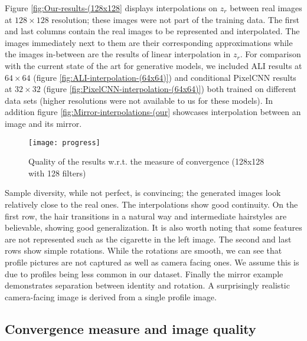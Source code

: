 \documentclass[english]{article}
\begin{document}
Figure \ref{fig:Our-results-(128x128} displays interpolations on
$z_{r}$ between real images at $128\times128$ resolution; these
images were not part of the training data. The first and last columns
contain the real images to be represented and interpolated. The images
immediately next to them are their corresponding approximations while
the images in-between are the results of linear interpolation in $z_{r}$.
For comparison with the current state of the art for generative models,
we included ALI \cite{dumoulin2016adversarially} results at $64\times64$
(figure \ref{fig:ALI-interpolation-(64x64)}) and conditional PixelCNN
\cite{oord2016conditional} results at $32\times32$ (figure \ref{fig:PixelCNN-interpolation-(64x64)})
both trained on different data sets (higher resolutions were not available
to us for these models). In addition figure \ref{fig:Mirror-interpolations-(our}
showcases interpolation between an image and its mirror.

\begin{figure}[b]
\centering{}\texttt{[image: progress]}\caption{Quality of the results w.r.t. the measure of convergence (128x128
with 128 filters)\label{fig:convqual}}
\end{figure}
Sample diversity, while not perfect, is convincing; the generated
images look relatively close to the real ones. The interpolations
show good continuity. On the first row, the hair transitions in a
natural way and intermediate hairstyles are believable, showing good
generalization. It is also worth noting that some features are not
represented such as the cigarette in the left image. The second and
last rows show simple rotations. While the rotations are smooth, we
can see that profile pictures are not captured as well as camera facing
ones. We assume this is due to profiles being less common in our dataset.
Finally the mirror example demonstrates separation between identity
and rotation. A surprisingly realistic camera-facing image is derived
from a single profile image.


\subsection{Convergence measure and image quality}
\end{document}
